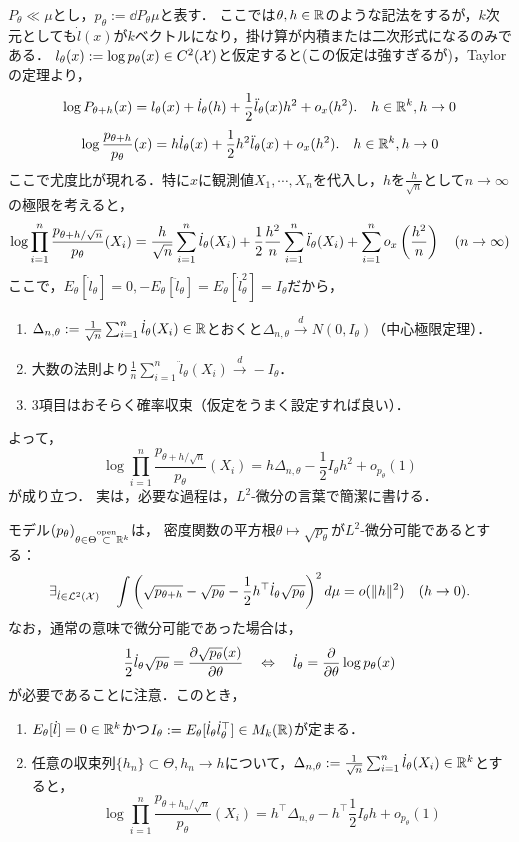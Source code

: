 \documentclass[uplatex,dvipdfmx]{jsreport}
\begin{document}
\begin{discussion}
    $P_\theta\ll\mu$とし，$p_\theta:=\dd{P_\theta}{\mu}$と表す．
    ここでは$\theta,h\in\mathbb{R}$のような記法をするが，$k$次元としても$\dot{l}(x)$が$k$ベクトルになり，掛け算が内積または二次形式になるのみである．
    $l_\theta(x):=\log p_\theta(x)\in C^2(\mathcal{X})$と仮定すると(この仮定は強すぎるが)，Taylorの定理より，
    \[\log P_{\theta+h}(x)=l_\theta(x)+\dot{l}_\theta(h)+\frac{1}{2}\ddot{l}_\theta(x)h^2+o_x(h^2).\quad h\in\mathbb{R}^k,h\to0\]
    \[\log\frac{p_{\theta+h}}{p_\theta}(x)=h\dot{l}_\theta(x)+\frac{1}{2}h^2\ddot{l}_\theta(x)+o_x(h^2).\quad h\in\mathbb{R}^k,h\to0\]
    ここで尤度比が現れる．特に$x$に観測値$X_1,\cdots,X_n$を代入し，$h$を$\frac{h}{\sqrt{n}}$として$n\to\infty$の極限を考えると，
    \[\log\prod_{i=1}^n\frac{p_{\theta+h/\sqrt{n}}}{p_\theta}(X_i)=\frac{h}{\sqrt{n}}\sum^n_{i=1}\dot{l}_\theta(X_i)+\frac{1}{2}\frac{h^2}{n}\sum^n_{i=1}\ddot{l}_\theta(X_i)+\sum_{i=1}^no_x\left(\frac{h^2}{n}\right)\quad(n\to\infty)\]
    ここで，$E_\theta[\dot{l}_\theta]=0,-E_\theta[\ddot{l}_\theta]=E_\theta[\dot{l}^2_\theta]=I_\theta$だから，
    \begin{enumerate}
        \item $\Delta_{n,\theta}:=\frac{1}{\sqrt{n}}\sum^n_{i=1}\dot{l}_\theta(X_i)\in\mathbb{R}$とおくと$\Delta_{n,\theta}\xrightarrow{d}N(0,I_\theta)$（中心極限定理）．
        \item 大数の法則より$\frac{1}{n}\sum^n_{i=1}\ddot{l}_\theta(X_i)\xrightarrow{d}-I_\theta$．
        \item 3項目はおそらく確率収束（仮定をうまく設定すれば良い）．
    \end{enumerate}
    よって，
    \[\log\prod_{i=1}^n\frac{p_{\theta+h/\sqrt{n}}}{p_\theta}(X_i)=h\Delta_{n,\theta}-\frac{1}{2}I_\theta h^2+o_{p_\theta}(1)\]
    が成り立つ．
    実は，必要な過程は，$L^2$-微分の言葉で簡潔に書ける．
\end{discussion}

\begin{theorem}[局所漸近正規性の十分条件]
    モデル$(p_\theta)_{\theta\in\Theta\overset{\mathrm{open}}{\subset}\mathbb{R}^k}$は，
    密度関数の平方根$\theta\mapsto\sqrt{p_\theta}$が$L^2$-微分可能であるとする：
    \[\exists_{\dot{l}\in\mathcal{L}^2(\mathcal{X})}\quad\int\left(\sqrt{p_{\theta+h}}-\sqrt{p_\theta}-\frac{1}{2}h^\top \dot{l}_\theta\sqrt{p_\theta}\right)^2d\mu=o(\|h\|^2)\quad(h\to0).\]
    なお，通常の意味で微分可能であった場合は，
    \[\frac{1}{2}\dot{l}_\theta\sqrt{p_\theta}=\frac{\partial \sqrt{p_\theta}(x)}{\partial \theta}\quad\Leftrightarrow\quad \dot{l}_\theta=\frac{\partial }{\partial \theta}\log p_\theta(x)\]
    が必要であることに注意．このとき，
    \begin{enumerate}
        \item $E_\theta[\dot{l}]=0\in\mathbb{R}^k$かつ$I_\theta:=E_\theta[\dot{l}_\theta\dot{l}_\theta^\top]\in M_k(\mathbb{R})$が定まる．
        \item 任意の収束列$\{h_n\}\subset\Theta,h_n\to h$について，$\Delta_{n,\theta}:=\frac{1}{\sqrt{n}}\sum^n_{i=1}\dot{l}_\theta(X_i)\in\mathbb{R}^k$とすると，
        \[\log\prod_{i=1}^n\frac{p_{\theta+h_n/\sqrt{n}}}{p_\theta}(X_i)=h^\top\Delta_{n,\theta}-h^\top\frac{1}{2}I_\theta h+o_{p_\theta}(1)\]
    \end{enumerate}
\end{theorem}
\end{document}

